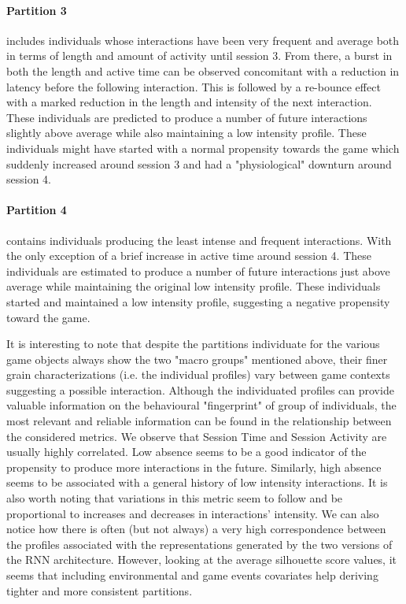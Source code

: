 \paragraph*{\textbf{Partition 3}} includes individuals whose interactions have been very frequent and average both in terms of length and amount of activity until session 3. From there, a burst in both the length and active time can be observed concomitant with a reduction in latency before the following interaction. This is followed by a re-bounce effect with a marked reduction in the length and intensity of the next interaction. These individuals are predicted to produce a number of future interactions slightly above average while also maintaining a low intensity profile. These individuals might have started with a normal propensity towards the game which suddenly increased around session 3 and had a "physiological" downturn around session 4. 

\paragraph*{\textbf{Partition 4}} contains individuals producing the least intense and frequent interactions. With the only exception of a brief increase in active time around session 4. These individuals are estimated to produce a number of future interactions just above average while maintaining the original low intensity profile. These individuals started and maintained a low intensity profile, suggesting a negative propensity toward the game. 

It is interesting to note that despite the partitions individuate for the various game objects always show the two "macro groups" mentioned above, their finer grain characterizations (i.e. the individual profiles) vary between game contexts suggesting a possible interaction. Although the individuated profiles can provide valuable information on the behavioural "fingerprint" of group of individuals, the most relevant and reliable information can be found in the relationship between the considered metrics. We observe that Session Time and Session Activity are usually highly correlated. Low absence seems to be a good indicator of the propensity to produce more interactions in the future. Similarly, high absence seems to be associated with a general history of low intensity interactions. It is also worth noting that variations in this metric seem to follow and be proportional to increases and decreases in interactions' intensity. We can also notice how there is often (but not always) a very high correspondence between the profiles associated with the representations generated by the two versions of the RNN architecture. However, looking at the average silhouette score values, it seems that including environmental and game events covariates help deriving tighter and more consistent partitions.

